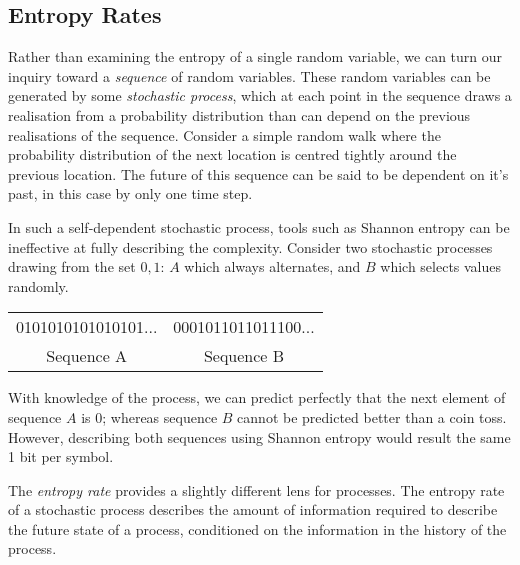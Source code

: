 

\subsection{Entropy Rates}\label{sec:entropyrate}

Rather than examining the entropy of a single random variable, we can turn our inquiry toward a \emph{sequence} of random variables. These random variables can be generated by some \emph{stochastic process}, which at each point in the sequence draws a realisation from a probability distribution than can depend on the previous realisations of the sequence. Consider a simple random walk where the probability distribution of the next location is centred tightly around the previous location. The future of this sequence can be said to be dependent on it's past, in this case by only one time step.

In such a self-dependent stochastic process, tools such as Shannon entropy can be ineffective at fully describing the complexity. Consider two stochastic processes drawing from the set ${0,1}$: $A$ which always alternates, and $B$ which selects values randomly.

\begin{center}
\begin{tabular}{cc}
0101010101010101...  &  0001011011011100... \\ 
Sequence A & Sequence B \\
\end{tabular}
\end{center}

With knowledge of the process, we can predict perfectly that the next element of sequence $A$ is 0; whereas sequence $B$ cannot be predicted better than a coin toss. However, describing both sequences using Shannon entropy would result the same 1 bit per symbol.

The \emph{entropy rate} provides a slightly different lens for processes. The entropy rate of a stochastic process describes the amount of information required to describe the future state of a process, conditioned on the information in the history of the process.

